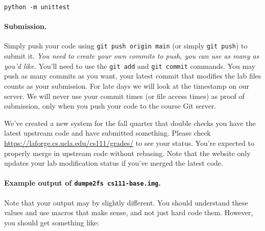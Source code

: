 \begin{lstlisting}[xleftmargin=2em]
python -m unittest
\end{lstlisting}

\paragraph{Submission.}

Simply push your code using \lstinline|git push origin main| (or simply
\lstinline|git push|) to submit it.
\textit{You need to create your own commits to push, you can use as many
as you'd like.}
You'll need to use the \texttt{git add} and \texttt{git commit} commands.
You may push as many commits as you want, your latest commit that modifies
the lab files counts as your submission.
For late days we will look at the timestamp on our server.
We will never use your commit times (or file access times) as proof of
submission, only when you push your code to the course Git server.

We've created a new system for the fall quarter that double checks you
have the latest upstream code and have submitted something.
Please check
\url{https://laforge.cs.ucla.edu/cs111/grades/}
to see your status.
You're expected to properly merge in upstream code without rebasing.
Note that the website only updates your lab modification status
if you've merged the latest code.

\newpage

\paragraph{Example output of \lstinline|dumpe2fs cs111-base.img|.}

Note that your output may by slightly different. You should understand these
values and use macros that make sense, and not just hard code them.
However, you should get something like:

